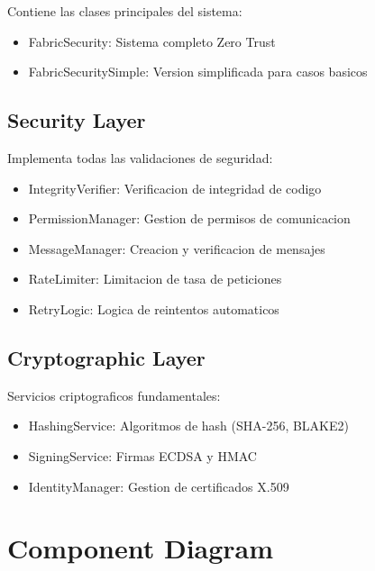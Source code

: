 \documentclass[12pt,a4paper]{report}
\newcommand{\class}[1]{\textsf{#1}}
\begin{document}
Contiene las clases principales del sistema:

\begin{itemize}
    \item \class{FabricSecurity}: Sistema completo Zero Trust
    \item \class{FabricSecuritySimple}: Version simplificada para casos basicos
\end{itemize}

\subsection{Security Layer}

Implementa todas las validaciones de seguridad:

\begin{itemize}
    \item \class{IntegrityVerifier}: Verificacion de integridad de codigo
    \item \class{PermissionManager}: Gestion de permisos de comunicacion
    \item \class{MessageManager}: Creacion y verificacion de mensajes
    \item \class{RateLimiter}: Limitacion de tasa de peticiones
    \item \class{RetryLogic}: Logica de reintentos automaticos
\end{itemize}

\subsection{Cryptographic Layer}

Servicios criptograficos fundamentales:

\begin{itemize}
    \item \class{HashingService}: Algoritmos de hash (SHA-256, BLAKE2)
    \item \class{SigningService}: Firmas ECDSA y HMAC
    \item \class{IdentityManager}: Gestion de certificados X.509
\end{itemize}

\section{Component Diagram}
\end{document}
